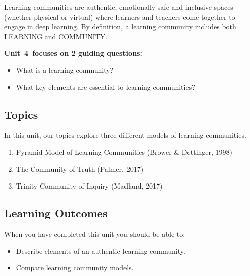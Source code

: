 \documentclass[
]{book}
\providecommand{\tightlist}{%
  \setlength{\itemsep}{0pt}\setlength{\parskip}{0pt}}
\begin{document}
Learning communities are authentic, emotionally-safe and inclusive spaces (whether physical or virtual) where learners and teachers come together to engage in deep learning. By definition, a learning community includes both LEARNING and COMMUNITY.

\textbf{Unit~4~focuses on 2 guiding questions:}

\begin{itemize}
\tightlist
\item
  What is a learning community?\\
\item
  What key elements are essential to learning communities?
\end{itemize}

\hypertarget{topics-3}{%
\subsection*{Topics}\label{topics-3}}

In this unit, our topics explore three different models of learning communities.

\begin{enumerate}
\def\labelenumi{\arabic{enumi}.}
\tightlist
\item
  Pyramid Model of Learning Communities (Brower \& Dettinger, 1998)\\
\item
  The Community of Truth (Palmer, 2017)\\
\item
  Trinity Community of Inquiry (Madland, 2017)
\end{enumerate}

\hypertarget{learning-outcomes-3}{%
\subsection*{Learning Outcomes}\label{learning-outcomes-3}}

When you have completed this unit you should be able to:

\begin{itemize}
\tightlist
\item
  Describe elements of an authentic learning community.\\
\item
  Compare learning community models.
\end{itemize}
\end{document}
